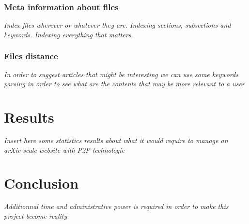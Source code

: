 \subsubsection{Meta information about files}

\textit{Index files wherever or whatever they are. Indexing sections, subsections
and keywords. Indexing everything that matters.}

\subsubsection{Files distance}

\textit{In order to suggest articles that might be interesting we can use
some keywords parsing in order to see what are the contents that may be more
relevant to a user}

\section{Results}

\textit{Insert here some statistics results about what 
it would require to manage an arXiv-scale website with P2P technologie}

\section{Conclusion}

\textit{Additionnal time and administrative power is required in order to
make this project become reality}

